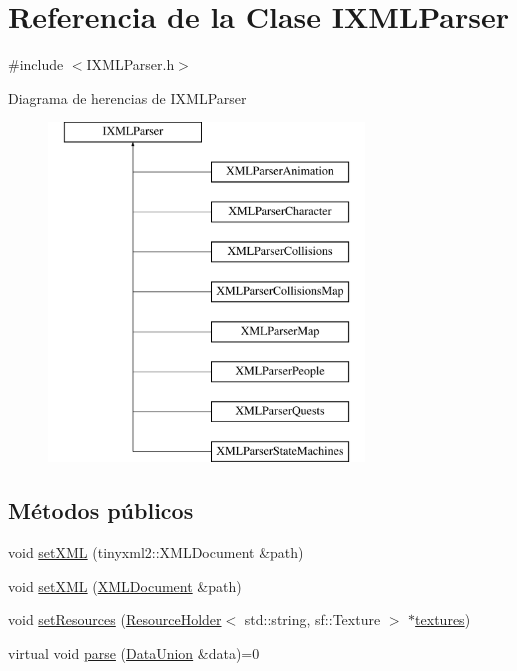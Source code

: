 \hypertarget{classIXMLParser}{}\section{Referencia de la Clase I\+X\+M\+L\+Parser}
\label{classIXMLParser}


{\ttfamily \#include $<$I\+X\+M\+L\+Parser.\+h$>$}

Diagrama de herencias de I\+X\+M\+L\+Parser\begin{figure}[H]
\begin{center}
\leavevmode
\includegraphics[height=9.000000cm]{classIXMLParser}
\end{center}
\end{figure}
\subsection*{Métodos públicos}
\begin{DoxyCompactItemize}
\item 
void \hyperlink{classIXMLParser_afe97ecb6c26a8d2c7d91ede1265b924d}{set\+X\+M\+L} (tinyxml2\+::\+X\+M\+L\+Document \&path)
\item 
void \hyperlink{classIXMLParser_a4e8bacc2f7ed0c13117e8e701cc5b9e4}{set\+X\+M\+L} (\hyperlink{classXMLDocument}{X\+M\+L\+Document} \&path)
\item 
void \hyperlink{classIXMLParser_a9ff44f69f9c9f995259514deb9e279e5}{set\+Resources} (\hyperlink{classResourceHolder}{Resource\+Holder}$<$ std\+::string, sf\+::\+Texture $>$ $\ast$\hyperlink{classIXMLParser_af05edc520158df67ae6417b626a09407}{textures})
\item 
virtual void \hyperlink{classIXMLParser_a2d6e54d4628bdf52a45ac1e18902b3d3}{parse} (\hyperlink{unionDataUnion}{Data\+Union} \&data)=0
\end{DoxyCompactItemize}
